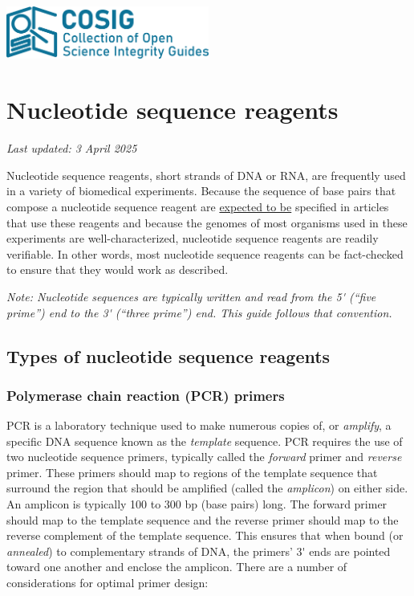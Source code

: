 \documentclass[letterpaper, 12pt]{article}
\begin{document}
\flushleft
\includegraphics[width=0.5\textwidth]{img/home/241017_final_logo_mockup.png}

\section*{Nucleotide sequence reagents}
\textit{Last updated: 3 April 2025}

Nucleotide sequence reagents, short strands of DNA or RNA, are frequently used in a variety of biomedical experiments. Because the sequence of base pairs that compose a nucleotide sequence reagent are \href{https://doi.org/10.1373/clinchem.2008.112797}{expected to be} specified in articles that use these reagents and because the genomes of most organisms used in these experiments are well-characterized, nucleotide sequence reagents are readily verifiable. In other words, most nucleotide sequence reagents can be fact-checked to ensure that they would work as described.

\textit{Note: Nucleotide sequences are typically written and read from the 5\'{} (``five prime'') end to the 3\'{} (``three prime'') end. This guide follows that convention.}

\subsection*{Types of nucleotide sequence reagents}

\subsubsection*{Polymerase chain reaction (PCR) primers}

PCR is a laboratory technique used to make numerous copies of, or \emph{amplify}, a specific DNA sequence known as the \emph{template} sequence. PCR requires the use of two nucleotide sequence primers, typically called the \emph{forward} primer and \emph{reverse} primer. These primers should map to regions of the template sequence that surround the region that should be amplified (called the \emph{amplicon}) on either side. An amplicon is typically 100 to 300 bp (base pairs) long. The forward primer should map to the template sequence and the reverse primer should map to the reverse complement of the template sequence. This ensures that when bound (or \emph{annealed}) to complementary strands of DNA, the primers' 3\'{} ends are pointed toward one another and enclose the amplicon. There are a number of considerations for optimal primer design:
\end{document}
